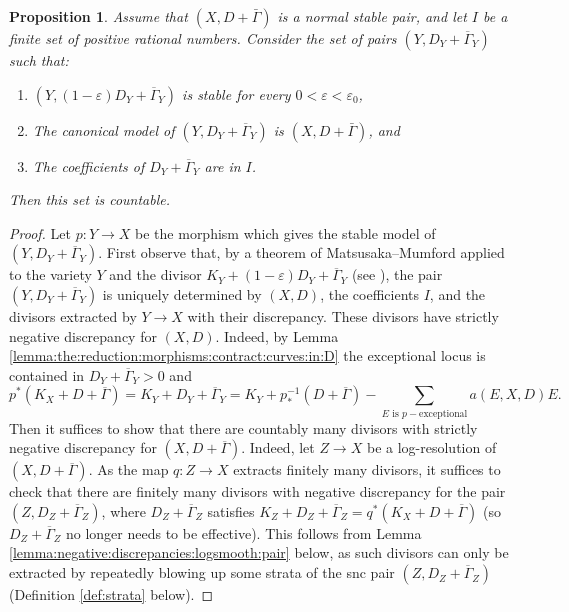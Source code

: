 \documentclass[11pt]{amsart}
\newtheorem{prop}[theorem]{Proposition}
\theoremstyle{definition}
\theoremstyle{remark}
\begin{document}
	\begin{prop}\label{prop:lc:case:finite}
		Assume that $(X,D + \bar{\Gamma})$ is a normal stable pair, and let $I$ be a finite set of positive rational numbers. Consider the set of pairs $(Y,D_Y + \overline{\Gamma}_Y)$ such that:
		\begin{enumerate}
			\item $(Y,(1-\varepsilon)D_Y + \overline{\Gamma}_Y)$ is stable for every $0<\varepsilon < \varepsilon_0$,
			\item The canonical model of $(Y,D_Y + \overline{\Gamma}_Y)$ is $(X,D + \bar{\Gamma})$, and
			\item The coefficients of $D_Y + \overline{\Gamma}_Y$ are in $I$.
		\end{enumerate}
		Then this set is countable.
	\end{prop}
	\begin{proof}Let $p:Y\to X$ be the morphism which gives the stable model of $(Y,D_Y + \overline{\Gamma}_Y)$. 
		First observe that, by a theorem of Matsusaka--Mumford applied to the variety $Y$ and the divisor $K_Y + (1-\varepsilon)D_Y + \overline{\Gamma}_Y$ (see \cite[Theorems 11.39 \& 11.40]{kollarmodulibook}), the pair $(Y,D_Y + \overline{\Gamma}_Y)$ is uniquely determined by $(X,D)$, the coefficients $I$, and the divisors extracted by $Y\to X$ with their discrepancy. These divisors have strictly negative discrepancy for $(X,D)$. Indeed, by Lemma \ref{lemma:the:reduction:morphisms:contract:curves:in:D} the exceptional locus is contained in $D_Y+\overline{\Gamma}_Y>0$ and $$p^*(K_X+D + \overline{\Gamma})=K_Y+D_Y + \overline{\Gamma}_Y = K_Y + p_*^{-1}(D + \overline{\Gamma}) - \sum_{E\text{ is }p-\text{exceptional}} a(E,X,D)E.$$
		Then it suffices to show that there are countably many divisors with strictly negative discrepancy for $(X,D + \overline{\Gamma})$. Indeed, let $Z\to X$ be a log-resolution of $(X,D + \overline{\Gamma})$. As the map $q:Z\to X$ extracts finitely many divisors, it suffices to check that there are finitely many divisors with negative discrepancy for the pair $(Z,D_Z + \overline{\Gamma}_Z)$, where $D_Z + \overline{\Gamma}_Z$ satisfies $K_Z+D_Z + \overline{\Gamma}_Z = q^*(K_X + D + \overline{\Gamma})$ (so $D_Z + \overline{\Gamma}_Z$ no longer needs to be effective). This follows from Lemma \ref{lemma:negative:discrepancies:logsmooth:pair} below, as such divisors can only be extracted by repeatedly blowing up some strata of the snc pair $(Z,D_Z + \overline{\Gamma}_Z)$ (Definition \ref{def:strata} below).
	\end{proof}
	
\end{document}
